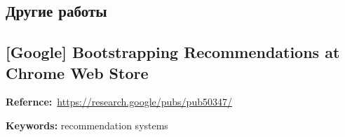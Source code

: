 \begin{bibunit}[plainnat]







\chapter{Другие работы}

\section*{[Google] Bootstrapping Recommendations at Chrome Web Store}

\textbf{Refernce:}~\url{https://research.google/pubs/pub50347/}

\textbf{Keywords:} recommendation systems \\



\putbib[refs_ir]
\end{bibunit}
